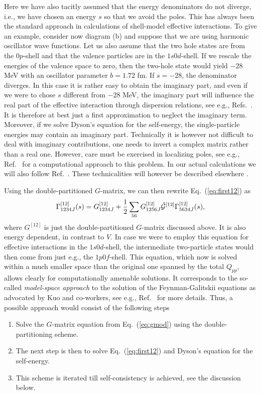 Here we have also tacitly assumed that the energy denominators
do not diverge, i.e., we have chosen an energy $s$
so that we avoid the poles. This has always been the standard
approach in calculations of shell-model 
effective interactions. To give an example, consider
now diagram (b) and suppose that we are using harmonic
oscillator wave functions. Let us also assume that the two
hole states are from the $0p$-shell and that the valence
particles are in the $1s0d$-shell. If we rescale the
energies of the valence space to zero, then the two-hole
state would yield $-28$ MeV with an oscillator parameter
$b=1.72$ fm. If $s=-28$, the denominator diverges.
In this case it is rather easy to obtain the imaginary
part, and even if we were to chose $s$ different
from $-28$ MeV, the imaginary part will influence the real
part of the effective interaction through dispersion
relations, see e.g., Refs.\ \cite{angels88,rpd89,ms92}.
It is therefore at best just a first approximation
to neglect the imaginary term.
Moreover, if we solve Dyson's equation for the 
self-energy, the single-particle energies may contain
an imaginary part. 
Technically it is however not difficult to deal
with imaginary contributions, one needs to 
invert a complex  matrix rather than a real one.
However, care must be exercised in localizing poles,
see e.g., Ref.\ \cite{landau97} for a
computational approach to this problem. In our actual
calculations we will also follow Ref.\
\cite{landau97}. These technicalities
will however be described elsewhere \cite{mhj99}. 

Using the double-partitioned $G$-matrix, we can then rewrite
Eq.\ (\ref{eq:first12}) as
\begin{equation}
      \Gamma^{[12]}_{1234J}(s) = 
      G^{[12]}_{1234J}+\frac{1}{2}
      \sum_{56}
      G^{[12]}_{1256J}\hat{{\cal G}}^{[12]}
      \Gamma^{[12]}_{5634J}(s),
      \label{eq:newfirst12}
\end{equation}
where $G^{[12]}$ is just the double-partitioned $G$-matrix
discussed above. It is also energy dependent,
in contrast to $V$.
In case we were to employ this equation for effective
interactions in the $1s0d$-shell, the intermediate two-particle
states would then come from just e.g., the $1p0f$-shell.
This equation, which now is solved within a much smaller space
than the original one spanned by the total $Q_{pp}$, allows
clearly for computationally amenable solutions. It corresponds
to the so-called {\em model-space approach} to the solution
of the Feynman-Galitskii equations as advocated by
Kuo and co-workers, see e.g., Ref.\ \cite{kt94}
for more details. Thus, a possible approach would consist
of the following steps 
\begin{enumerate}
\item Solve the $G$-matrix equation from Eq.\ (\ref{eq:gmod})
      using the double-partitioning scheme.
\item The next step is then to solve Eq.\ (\ref{eq:first12})
      and Dyson's equation for the self-energy.
\item This scheme is iterated till self-consistency is achieved,
      see the discussion below. 
\end{enumerate}

